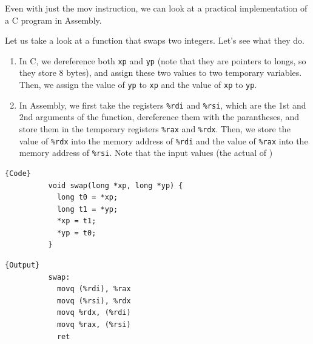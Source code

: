 \documentclass{article}
\begin{document}
      Even with just the mov instruction, we can look at a practical implementation of a C program in Assembly. 

      \begin{example}
        Let us take a look at a function that swaps two integers. Let's see what they do. 
        \begin{enumerate}
          \item In C, we dereference both \texttt{xp} and \texttt{yp} (note that they are pointers to longs, so they store 8 bytes), and assign these two values to two temporary variables. Then, we assign the value of \texttt{yp} to \texttt{xp} and the value of \texttt{xp} to \texttt{yp}.
          \item In Assembly, we first take the registers \texttt{\%rdi} and \texttt{\%rsi}, which are the 1st and 2nd arguments of the function, dereference them with the parantheses, and store them in the temporary registers \texttt{\%rax} and \texttt{\%rdx}. Then, we store the value of \texttt{\%rdx} into the memory address of \texttt{\%rdi} and the value of \texttt{\%rax} into the memory address of \texttt{\%rsi}. Note that the input values (the actual of )
        \end{enumerate}

        \noindent\begin{minipage}{.5\textwidth}
        \begin{lstlisting}[]{Code}
          void swap(long *xp, long *yp) {
            long t0 = *xp;
            long t1 = *yp;
            *xp = t1;
            *yp = t0;
          }
        \end{lstlisting}
        \end{minipage}
        \hfill
        \begin{minipage}{.49\textwidth}
        \begin{lstlisting}[]{Output}
          swap:
            movq (%rdi), %rax
            movq (%rsi), %rdx
            movq %rdx, (%rdi)
            movq %rax, (%rsi)
            ret
        \end{lstlisting}
        \end{minipage}
      \end{example}
\end{document}
